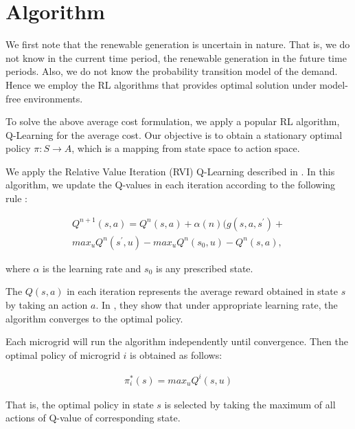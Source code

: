 \section{Algorithm}
We first note that the renewable generation is uncertain in nature. That is, we do not know in the current time period, the renewable generation in the future time periods. Also, we do not know the probability transition model of the demand. Hence we employ the RL algorithms that provides optimal solution under model-free environments.

To solve the above average cost formulation, we apply a popular RL algorithm, Q-Learning for the average cost. Our objective is to obtain a stationary optimal policy $\pi : S \rightarrow A$, which is a mapping from state space to action space.  

We apply the Relative Value Iteration (RVI) Q-Learning described in \cite{avgcost}. In this algorithm, we update the Q-values in each iteration according to the following rule :

\begin{align}
Q^{n+1}(s,a) = Q^{n}(s,a) + \alpha(n)(g(s,a,s^{'}) + \\ max_{u} Q^{n}(s^{'},u) - max_{u} Q^{n}(s_{0},u) - Q^{n}(s,a),
\end{align}

where $\alpha$ is the learning rate and $s_{0}$ is any prescribed state.

The $Q(s,a)$ in each iteration represents the average reward obtained in state $s$ by taking an action $a$. In \cite{avgcost}, they show that under appropriate learning rate, the algorithm converges to the  optimal policy. 

Each microgrid will run the algorithm independently until convergence. Then the optimal policy of microgrid $i$ is obtained as follows:

\begin{align}
\pi_{i}^{*}(s) = max_{u}Q^{i}(s,u)
\end{align}

That is, the optimal policy in state $s$ is selected by taking the maximum of all actions of Q-value of corresponding state. 

